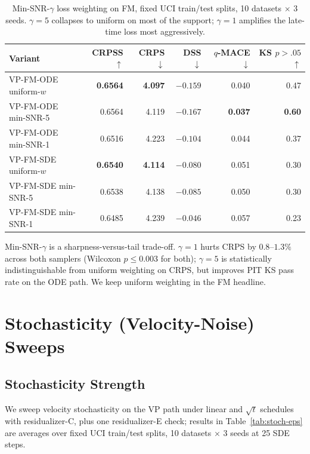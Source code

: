 \documentclass{tpm2026}
\begin{document}
\begin{table}[!h]
  \centering
  \caption{Min-SNR-$\gamma$ loss weighting on FM, fixed UCI train/test splits, 10 datasets $\times$ 3 seeds. $\gamma=5$ collapses to uniform on most of the support; $\gamma=1$ amplifies the late-time loss most aggressively.}\label{tab:minsnr}
  \footnotesize
  \begin{tabular}{lrrrrr}
    \toprule
    Variant & CRPSS $\uparrow$ & CRPS $\downarrow$ & DSS $\downarrow$ & $q$-MACE $\downarrow$ & KS $p{>}.05$ $\uparrow$ \\
    \midrule
    VP-FM-ODE uniform-$w$ & \textbf{0.6564} & \textbf{4.097} & $-0.159$ & 0.040 & 0.47 \\
    VP-FM-ODE min-SNR-5   & 0.6564 & 4.119 & $-0.167$ & \textbf{0.037} & \textbf{0.60} \\
    VP-FM-ODE min-SNR-1   & 0.6516 & 4.223 & $-0.104$ & 0.044 & 0.37 \\
    VP-FM-SDE uniform-$w$ & \textbf{0.6540} & \textbf{4.114} & $-0.080$ & 0.051 & 0.30 \\
    VP-FM-SDE min-SNR-5   & 0.6538 & 4.138 & $-0.085$ & 0.050 & 0.30 \\
    VP-FM-SDE min-SNR-1   & 0.6485 & 4.239 & $-0.046$ & 0.057 & 0.23 \\
    \bottomrule
  \end{tabular}
\end{table}

Min-SNR-$\gamma$ is a sharpness-versus-tail trade-off. $\gamma=1$ hurts CRPS by $0.8$--$1.3\%$ across both samplers (Wilcoxon $p \leq 0.003$ for both); $\gamma=5$ is statistically indistinguishable from uniform weighting on CRPS, but improves PIT KS pass rate on the ODE path. We keep uniform weighting in the FM headline.

\section{Stochasticity (Velocity-Noise) Sweeps}\label{app:stoch}

\subsection{Stochasticity Strength}\label{app:stoch-eps}

We sweep velocity stochasticity on the VP path under linear and $\sqrt{t}$ schedules with residualizer-C, plus one residualizer-E check; results in Table~\ref{tab:stoch-eps} are averages over fixed UCI train/test splits, 10 datasets $\times$ 3 seeds at 25 SDE steps.
\end{document}
